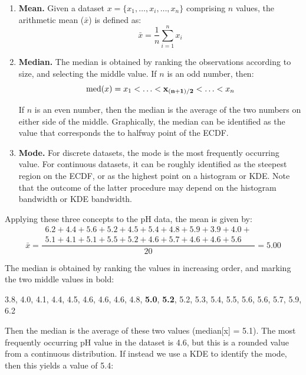\begin{enumerate}
\item{\bf Mean.} Given a dataset $x = \{x_1,\ldots ,x_i,\ldots, x_n\}$
  comprising $n$ values, the arithmetic mean ($\bar{x}$) is defined
  as:
  \begin{equation}
    \bar{x} = \frac{1}{n}\sum\limits_{i=1}^{n}x_i
    \label{eq:mean}
  \end{equation}
\item{\bf Median.} The median is obtained by ranking the observations
  according to size, and selecting the middle value. If $n$ is an odd
  number, then:
  \begin{equation}
    \mbox{med}(x) = x_1 < \ldots < {\bf x_{(n+1)/2}} < \ldots < x_n
  \end{equation}

  If $n$ is an even number, then the median is the average of the two
  numbers on either side of the middle. Graphically, the median can be
  identified as the value that corresponds the to halfway point of the
  ECDF.
  
\item{\bf Mode.} For discrete datasets, the mode is the most
  frequently occurring value. For continuous datasets, it can be
  roughly identified as the steepest region on the ECDF, or as the
  highest point on a histogram or KDE. Note that the outcome of the
  latter procedure may depend on the histogram bandwidth or KDE
  bandwidth.
\end{enumerate}

Applying these three concepts to the pH data, the mean is given by:
\begin{equation*}
  \bar{x} = \frac{
    \begin{array}{c}
      6.2+4.4+5.6+5.2+4.5+5.4+4.8+5.9+3.9+4.0+ \\
      5.1+4.1+5.1+5.5+5.2+4.6+5.7+4.6+4.6+5.6
    \end{array}
  }{20} = 5.00
\end{equation*}

The median is obtained by ranking the values in increasing order, and
marking the two middle values in bold:

\begin{center}
  {3.8, 4.0, 4.1, 4.4, 4.5, 4.6, 4.6, 4.6, 4.8, \textbf{5.0},
  \textbf{5.2}, 5.2, 5.3, 5.4, 5.5, 5.6, 5.6, 5.7, 5.9, 6.2}
\end{center}

Then the median is the average of these two values (median[x] =
5.1). The most frequently occurring pH value in the dataset is 4.6,
but this is a rounded value from a continuous distribution. If instead
we use a KDE to identify the mode, then this yields a value of 5.4:

